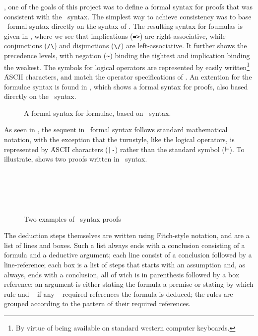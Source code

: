 \documentclass[BA.tex]{subfiles}
\begin{document}
, one of the goals of this project
 was to define a formal syntax for proofs that was consistent with the
 \bp\ syntax\cite{boxhelp}. The simplest way to achieve consistency
 was to base \our\ formal syntax directly on the syntax of \bp.
 The resulting syntax for foumulas is given in , where we see
 that implications (\verb+=>+) are right-associative, while conjunctions 
 (\verb+/\+) and disjunctions (\verb+\/+) are left-associative. It further
 shows the precedence levels, with negation (\verb+~+) binding the tightest
 and implication binding the weakest. The symbols for logical operators are
 represented by easily written\footnote{By virtue of being available on 
 standard western computer keyboards.} \f{ASCII} characters, and match the
 operator specifications of \bp.
 An extention for the formulae syntax is found in , 
 which shows a formal
 syntax for proofs, also based directly on the \bp\ syntax.

\begin{figure}[t]

\caption[A {\bf formal} syntax for formulae]
{A formal syntax for formulae, based on \bp\ syntax.}
\label{fform}
\end{figure}

 As seen in , the sequent in \our\ formal syntax
 follows standard mathematical notation, with the exception that the
 turnstyle, like the  logical operators, is represented by
 \f{ASCII} characters (\verb+|-+) rather than the standard symbol 
 (\(\vdash\)). To illustrate,  shows two proofs
 written in \bp\ syntax.

\begin{figure}[!h]
\centering
\begin{subfigure}[t]{0.45\textwidth}
\scriptsize

~\\~\\~\\
\label{sf:exr}
\end{subfigure}
\(\quad\)
\begin{subfigure}[t]{0.45\textwidth}
\scriptsize

\label{sf:exq}
\end{subfigure}
\caption[]{Two examples of \bp\ syntax proofs}
\label{bpex}
\end{figure}
 
 The deduction steps themselves are written using 
 Fitch-style notation\cite{boxhelp},
 and are a list of lines and boxes. Such a list always ends with a 
 conclusion consisting of a formula
 and a deductive argument; each line consist of a conclusion followed 
 by a line-reference; each box is a list of steps that starts with an 
 assumption and, as always, ends with a conclusion, all of wich is in
 parenthesis followed by a box reference; an argument is either stating
 the formula a premise or stating by which rule and -- if any -- required 
 references the formula is deduced; the rules are grouped according to the
 pattern of their required references. 
 
\end{document}
